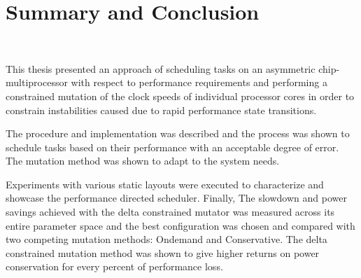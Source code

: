 \chapter{Summary and Conclusion}~\label{chap:conclusion}

This thesis presented an approach of scheduling tasks on an asymmetric chip-multiprocessor
with respect to performance requirements and performing a constrained mutation
of the clock speeds of individual processor cores in order to constrain instabilities 
caused due to rapid performance state transitions. 

The procedure and implementation was described and the process was shown to schedule
tasks based on their performance with an acceptable degree of error. The mutation 
method was shown to adapt to the system needs.

Experiments with various static layouts were executed to characterize and showcase 
the performance directed scheduler. Finally, The slowdown and power savings 
achieved with the delta constrained mutator was measured across its entire parameter space
and the best configuration was chosen and compared with two competing mutation methods: 
Ondemand and Conservative. 
The delta constrained mutation method was shown
to give higher returns on power conservation for every percent of performance loss. 